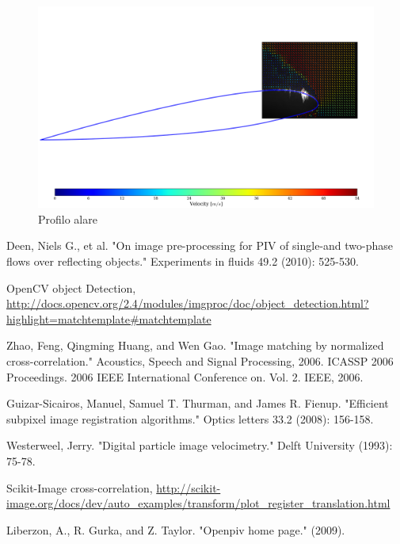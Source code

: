 \documentclass[a4paper]{article}
\begin{document}
\begin{figure}[h]
	\centering
	\includegraphics[width=1\textwidth]{images/All_norm_CM_32_orig.png}
	\caption{Profilo alare}
	\label{fig:airfoil}
\end{figure}

\newpage

\begin{thebibliography}{9}
Deen, Niels G., et al. "On image pre-processing for PIV of single-and two-phase flows over reflecting objects." Experiments in fluids 49.2 (2010): 525-530.

OpenCV object Detection, \url{http://docs.opencv.org/2.4/modules/imgproc/doc/object_detection.html?highlight=matchtemplate#matchtemplate}

Zhao, Feng, Qingming Huang, and Wen Gao. "Image matching by normalized cross-correlation." Acoustics, Speech and Signal Processing, 2006. ICASSP 2006 Proceedings. 2006 IEEE International Conference on. Vol. 2. IEEE, 2006.

Guizar-Sicairos, Manuel, Samuel T. Thurman, and James R. Fienup. "Efficient subpixel image registration algorithms." Optics letters 33.2 (2008): 156-158.

Westerweel, Jerry. "Digital particle image velocimetry." Delft University (1993): 75-78.

Scikit-Image cross-correlation,
\url{http://scikit-image.org/docs/dev/auto_examples/transform/plot_register_translation.html}

Liberzon, A., R. Gurka, and Z. Taylor. "Openpiv home page." (2009).

\end{thebibliography}
\end{document}
